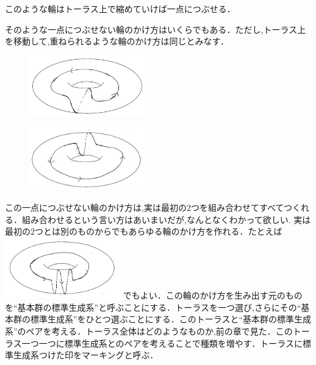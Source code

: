 このような輪はトーラス上で縮めていけば一点につぶせる．

そのような一点につぶせない輪のかけ方はいくらでもある．ただし,トーラス上を移動して,重ねられるような輪のかけ方は同じとみなす．\\
\begin{figure}[h]
\begin{minipage}{0.5\hsize}
\includegraphics[width=5cm]{asaka12.png}\\
\end{minipage}
\begin{minipage}{0.5\hsize}
\includegraphics[width=5cm]{asaka121.png}\\
\end{minipage}
\end{figure}
この一点につぶせない輪のかけ方は,実は最初の$2$つを組み合わせてすべてつくれる．組み合わせるという言い方はあいまいだが,なんとなくわかって欲しい.
\newpage
実は最初の$2$つとは別のものからでもあらゆる輪のかけ方を作れる．たとえば\\
\includegraphics[width=5cm]{asaka14.png}
でもよい．この輪のかけ方を生み出す元のものを``基本群の標準生成系''と呼ぶことにする．トーラスを一つ選び,さらにその``基本群の標準生成系''をひとつ選ぶことにする．このトーラスと``基本群の標準生成系''のペアを考える．トーラス全体はどのようなものか,前の章で見た．このトーラス一つ一つに標準生成系とのペアを考えることで種類を増やす．トーラスに標準生成系つけた印をマーキングと呼ぶ．

